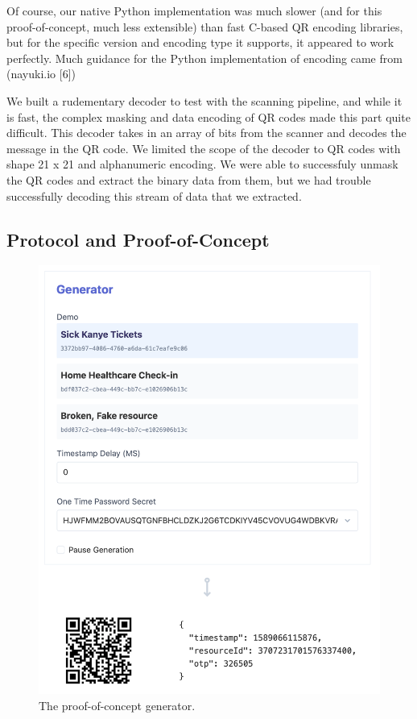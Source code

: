 \documentclass[10pt,twocolumn,letterpaper]{article}
\begin{document}
Of course, our native Python implementation was much slower (and for this proof-of-concept, much less extensible) than fast C-based QR encoding libraries, but for the specific version and encoding type it supports, it appeared to work perfectly. Much guidance for the Python implementation of encoding came from (nayuki.io [6])

We built a rudementary decoder to test with the scanning pipeline, and while it is fast, the complex masking and data encoding of QR codes made this part quite difficult. This decoder takes in an array of bits from the scanner and decodes the message in the QR code. We limited the scope of the decoder to QR codes with shape 21 x 21 and alphanumeric encoding. We were able to successfuly unmask the QR codes and extract the binary data from them, but we had trouble successfully decoding this stream of data that we extracted. 

\subsection{Protocol and Proof-of-Concept}

\begin{figure}[t]
   \begin{center}
      \includegraphics[width=0.8\linewidth]{gen.png}
   \end{center}
      \caption{The proof-of-concept generator.}
   \label{fig:gen}
\end{figure}
\end{document}
